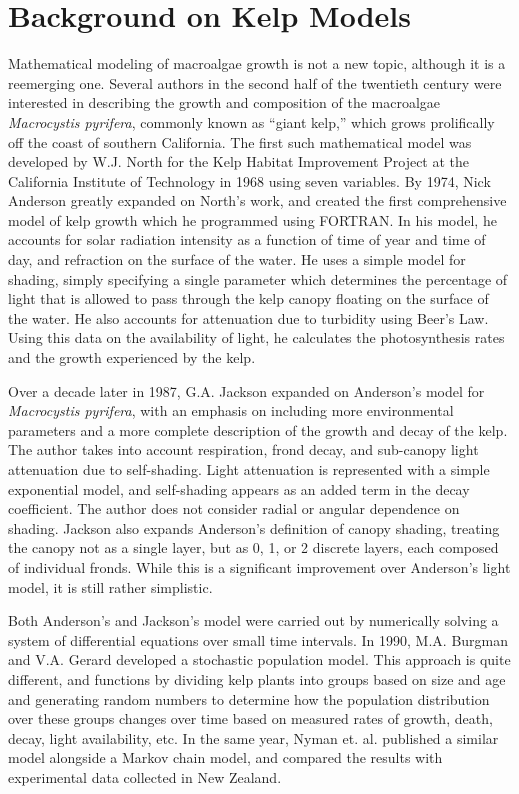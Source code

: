\documentclass[ms,cpyr,lof,lot]{uathesis}
\begin{document}
\section{Background on Kelp Models}

Mathematical modeling of macroalgae growth is not a new topic, although it is a reemerging one.
Several authors in the second half of the twentieth century were interested in describing the growth and composition of the macroalgae \textit{Macrocystis pyrifera}, commonly known as ``giant kelp,'' which grows prolifically off the coast of southern California.
The first such mathematical model was developed by W.J. North for the Kelp Habitat Improvement Project at the California Institute of Technology in 1968 using seven variables.
By 1974, Nick Anderson greatly expanded on North's work, and created the first comprehensive model of kelp growth which he programmed using FORTRAN\cite{anderson_mathematical_1974}.
In his model, he accounts for solar radiation intensity as a function of time of year and time of day, and refraction on the surface of the water.
He uses a simple model for shading, simply specifying a single parameter which determines the percentage of light that is allowed to pass through the kelp canopy floating on the surface of the water.
He also accounts for attenuation due to turbidity using Beer's Law.
Using this data on the availability of light, he calculates the photosynthesis rates and the growth experienced by the kelp.

Over a decade later in 1987, G.A.
Jackson expanded on Anderson's model for \textit{Macrocystis pyrifera}, with an emphasis on including more environmental parameters and a more complete description of the growth and decay of the kelp\cite{jackson_modelling_1987}. 
The author takes into account respiration, frond decay, and sub-canopy light attenuation due to self-shading.
Light attenuation is represented with a simple exponential model, and self-shading appears as an added term in the decay coefficient.
The author does not consider radial or angular dependence on shading. 
Jackson also expands Anderson's definition of canopy shading, treating the canopy not as a single layer, but as 0, 1, or 2 discrete layers, each composed of individual fronds.
While this is a significant improvement over Anderson's light model, it is still rather simplistic.

Both Anderson's and Jackson's model were carried out by numerically solving a system of differential equations over small time intervals.
In 1990, M.A. Burgman and V.A. Gerard developed a stochastic population model\cite{burgman_stage-structured_1990}.
This approach is quite different, and functions by dividing kelp plants into groups based on size and age and generating random numbers to determine how the population distribution over these groups changes over time based on measured rates of growth, death, decay, light availability, etc.
In the same year, Nyman et. al. published a similar model alongside a Markov chain model, and compared the results with experimental data collected in New Zealand\cite{nyman_macrocystis_1990}.
\end{document}
